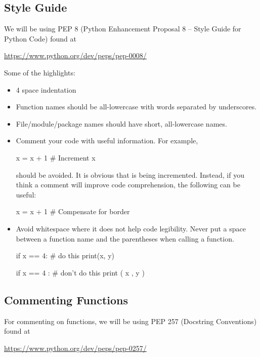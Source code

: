 \documentclass[11pt]{cselabheader}
\begin{document}
{\subsection{Style Guide}

We will be using PEP 8 (Python Enhancement Proposal 8 -- Style Guide for Python
Code) found at
\begin{center}
  \url{https://www.python.org/dev/peps/pep-0008/}
\end{center}

Some of the highlights:
\begin{itemize}
  \item 4 space indentation
  \item Function names should be all-lowercase with words separated by underscores.
  \item File/module/package names should have short, all-lowercase names.
  \item Comment your code with useful information. For example,

    \begin{python3code}
x = x + 1 # Increment x
    \end{python3code}

    should be avoided. It is obvious that  is being incremented.
    Instead, if you think a comment will improve code comprehension, the
    following can be useful:

    \begin{python3code}
x = x + 1 # Compensate for border
    \end{python3code}

  \item Avoid whitespace where it does not help code legibility. Never put a
    space between a function name and the parentheses when calling a function.

    \begin{python3code}
if x == 4: # do this
    print(x, y)

if x == 4 : # don't do this
    print ( x , y )
    \end{python3code}
\end{itemize}

\pagebreak
\subsection{Commenting Functions}

For commenting on functions, we will be using PEP 257 (Docstring Conventions)
found at
\begin{center}
  \url{https://www.python.org/dev/peps/pep-0257/}
\end{center}

}
\end{document}

